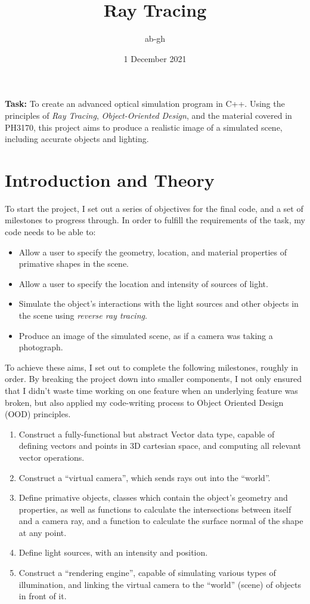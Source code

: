 \documentclass[a4paper]{article}
\title{Ray Tracing}
\author{ab-gh}
\date{1 December 2021}
\begin{document}
\maketitle

{\bf Task:} To create an advanced optical simulation program in C++. Using the principles of {\it Ray Tracing}, {\it Object-Oriented Design}, and the material covered in PH3170, this project aims to produce a realistic image of a simulated scene, including accurate objects and lighting.

\section{Introduction and Theory}
To start the project, I set out a series of objectives for the final code, and a set of milestones to progress through. In order to fulfill the requirements of the task, my code needs to be able to:
\begin{itemize}
  \item{Allow a user to specify the geometry, location, and material properties of primative shapes in the scene.}
  \item{Allow a user to specify the location and intensity of sources of light.}
  \item{Simulate the object's interactions with the light sources and other objects in the scene using {\it reverse ray tracing}.}
  \item{Produce an image of the simulated scene, as if a camera was taking a photograph.}
\end{itemize}
To achieve these aims, I set out to complete the following milestones, roughly in order. By breaking the project down into smaller components, I not only ensured that I didn't waste time working on one feature when an underlying feature was broken, but also applied my code-writing process to Object Oriented Design (OOD) principles.
\begin{enumerate}
  \item{Construct a fully-functional but abstract Vector data type, capable of defining vectors and points in 3D cartesian space, and computing all relevant vector operations.}
  \item{Construct a ``virtual camera'', which sends rays out into the ``world''.}
  \item{Define primative objects, classes which contain the object's geometry and properties, as well as functions to calculate the intersections between itself and a camera ray, and a function to calculate the surface normal of the shape at any point.}
  \item{Define light sources, with an intensity and position.}
  \item{Construct a ``rendering engine'', capable of simulating various types of illumination, and linking the virtual camera to the ``world'' (scene) of objects in front of it.}
\end{enumerate}
\end{document}
